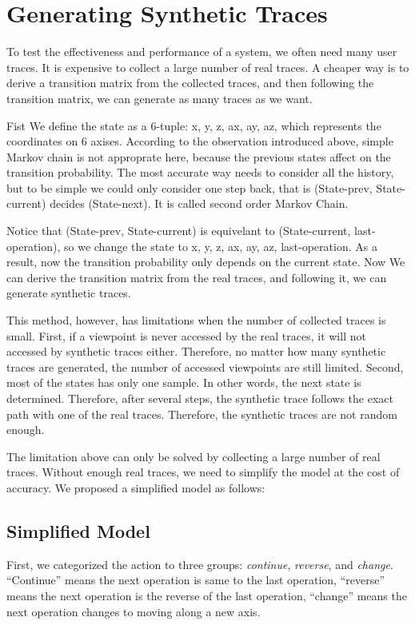 \section{Generating Synthetic Traces}
To test the effectiveness and performance of a system, we often need many user traces. It is expensive to collect a large number 
of real traces. A cheaper way is to derive a transition matrix from the collected traces, and then following the transition
matrix, we can generate as many traces as we want.

Fist We define the state as a 6-tuple: {x, y, z, ax, ay, az}, which represents the coordinates on 6 axises. 
According to the observation introduced above, simple Markov chain is not approprate here, because
the previous states affect on the transition probability. The most accurate way needs to consider all the
history, but to be simple we could only consider one step back, that is (State-prev, State-current) decides 
(State-next). It is called second order Markov Chain. 

Notice that (State-prev, State-current) is equivelant to (State-current, last-operation), so we change the 
state to {x, y, z, ax, ay, az, last-operation}. As a result, now the transition probability only depends on 
the current state. Now We can derive the transition matrix from the real traces, and following it, we can generate
synthetic traces.

This method, however, has limitations when the number of collected traces is small. First, if a viewpoint is 
never accessed by the real traces, it will not accessed by synthetic traces either. Therefore, no matter how
many synthetic traces are generated, the number of accessed viewpoints are still limited. Second, most of the
states has only one sample. In other words, the next state is determined. Therefore, after several steps, the
synthetic trace follows the exact path with one of the real traces. Therefore, the synthetic traces are not 
random enough.

The limitation above can only be solved by collecting a large number of real traces. Without enough real traces,
we need to simplify the model at the cost of accuracy. We proposed a simplified model as follows:
\subsection{Simplified Model}
First, we categorized the action to three groups: \textit{continue}, \textit{reverse}, and \textit{change}. 
``Continue'' means the next operation is same to the last operation, ``reverse'' means the next operation
is the reverse of the last operation, ``change'' means the next operation changes to moving along a new axis.

